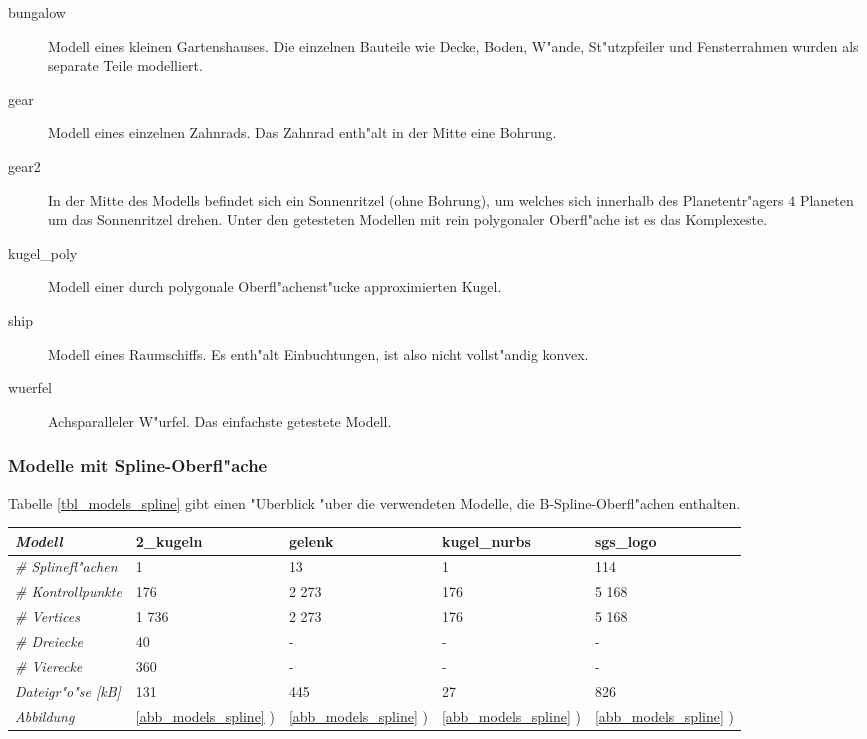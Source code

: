 \begin{description}
\item[bungalow] Modell eines kleinen Gartenshauses. Die einzelnen Bauteile 
    wie Decke, Boden, W"ande, St"utzpfeiler und Fensterrahmen wurden als 
    separate Teile modelliert. 
\item[gear] Modell eines einzelnen Zahnrads. Das Zahnrad enth"alt in der Mitte 
    eine Bohrung. 
\item[gear2] In der Mitte des Modells befindet sich ein Sonnenritzel  
    (ohne Bohrung), um welches sich innerhalb des Planetentr"agers 
    $4$ Planeten um das Sonnenritzel drehen. Unter den getesteten Modellen 
    mit rein polygonaler Oberfl"ache ist es das Komplexeste.  
\item[kugel\_poly]\label{model_kugel_poly} 
    Modell einer durch polygonale Oberfl"achenst"ucke approximierten Kugel. 
\item[ship] 
    Modell eines Raumschiffs. Es enth"alt Einbuchtungen, ist also nicht 
    vollst"andig konvex. 
\item[wuerfel]
    Achsparalleler W"urfel. Das einfachste getestete Modell. 
\end{description}

\subsubsection{Modelle mit Spline-Oberfl"ache}
Tabelle \ref{tbl_models_spline} gibt einen "Uberblick "uber die verwendeten 
Modelle, die B-Spline-Oberfl"achen enthalten. 

\tabbeg
\setcounter{piccount}{0}
\newcommand\picref{
    \stepcounter{piccount}\ref{abb_models_spline} \alph{piccount})}
\newcommand\myitem[5]{\hline %
    \emph{#1} & {\hfill #2} & {\hfill #3} & {\hfill #4} & {\hfill #5}}
\begin{tabularx}{\linewidth}{|l|X|X|X|X|}
\hline
\bf\emph{Modell} & \bf {\hfil 2\_kugeln} & \bf {\hfil gelenk} & 
    \bf {\hfil kugel\_nurbs} & \bf {\hfil sgs\_logo}\\
\myitem{\# Splinefl"achen}{    1}{   13}{  1}{  114}\\
\myitem{\# Kontrollpunkte}{  176}{2 273}{176}{5 168}\\
\myitem{\# Vertices      }{1 736}{2 273}{176}{5 168}\\
\myitem{\# Dreiecke      }{   40}{    -}{  -}{    -}\\
\myitem{\# Vierecke      }{  360}{    -}{  -}{    -}\\
\myitem{Dateigr"o"se [kB]}{131}{445}{27}{826}\\
\myitem{Abbildung}{\picref}{\picref}{\picref}{\picref}\\
\hline
\end{tabularx}

